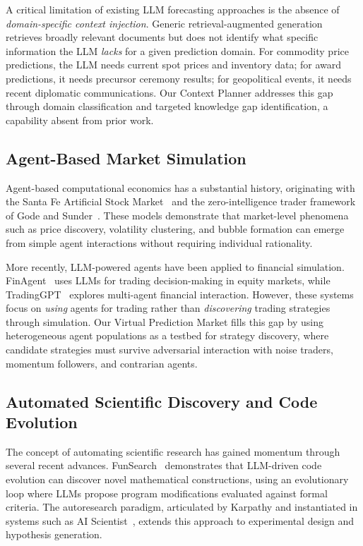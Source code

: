 A critical limitation of existing LLM forecasting approaches is the absence of \emph{domain-specific context injection}. Generic retrieval-augmented generation retrieves broadly relevant documents but does not identify what specific information the LLM \emph{lacks} for a given prediction domain. For commodity price predictions, the LLM needs current spot prices and inventory data; for award predictions, it needs precursor ceremony results; for geopolitical events, it needs recent diplomatic communications. Our Context Planner addresses this gap through domain classification and targeted knowledge gap identification, a capability absent from prior work.

\subsection{Agent-Based Market Simulation}

Agent-based computational economics has a substantial history, originating with the Santa Fe Artificial Stock Market~\cite{arthur1997asset} and the zero-intelligence trader framework of Gode and Sunder~\cite{gode1993allocative}. These models demonstrate that market-level phenomena such as price discovery, volatility clustering, and bubble formation can emerge from simple agent interactions without requiring individual rationality.

More recently, LLM-powered agents have been applied to financial simulation. FinAgent~\cite{zhang2024finagent} uses LLMs for trading decision-making in equity markets, while TradingGPT~\cite{li2023tradinggpt} explores multi-agent financial interaction. However, these systems focus on \emph{using} agents for trading rather than \emph{discovering} trading strategies through simulation. Our Virtual Prediction Market fills this gap by using heterogeneous agent populations as a testbed for strategy discovery, where candidate strategies must survive adversarial interaction with noise traders, momentum followers, and contrarian agents.

\subsection{Automated Scientific Discovery and Code Evolution}

The concept of automating scientific research has gained momentum through several recent advances. FunSearch~\cite{romera2024mathematical} demonstrates that LLM-driven code evolution can discover novel mathematical constructions, using an evolutionary loop where LLMs propose program modifications evaluated against formal criteria. The autoresearch paradigm, articulated by Karpathy and instantiated in systems such as AI Scientist~\cite{lu2024aiscientist}, extends this approach to experimental design and hypothesis generation.

